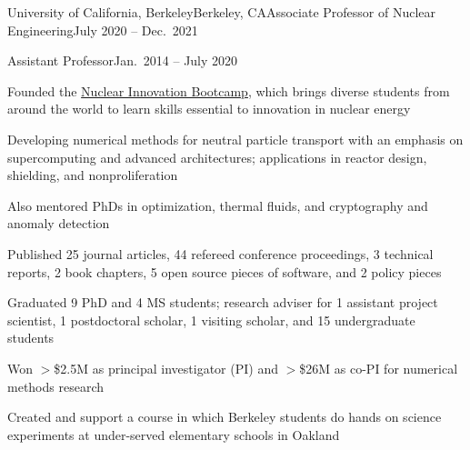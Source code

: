 \begin{rSubsection}{University of California, Berkeley}{Berkeley, CA}{Associate Professor of Nuclear Engineering}{July 2020 -- Dec.\ 2021}
\end{rSubsection}
\vspace*{-2 em}
\begin{rSubsection}{}{}{Assistant Professor}{Jan.\ 2014 -- July 2020}
\item Founded the \href{https://www.nuclearinnovationbootcamp.org/}{Nuclear Innovation Bootcamp}, which brings diverse students from around the world to learn skills essential to innovation in nuclear energy 
\item Developing numerical methods for neutral particle transport with an emphasis on supercomputing and advanced architectures; applications in reactor design, shielding, and nonproliferation
\item Also mentored PhDs in optimization, thermal fluids, and cryptography and anomaly detection 
\item Published 25 journal articles, 44 refereed conference proceedings, 3 technical reports, 2 book chapters, 5 open source pieces of software, and 2 policy pieces
\item Graduated 9 PhD and 4 MS students; research adviser for 1 assistant project scientist, 1 postdoctoral scholar, 1 visiting scholar, and 15 undergraduate students
\item Won $>$\$2.5M as principal investigator (PI) and $>$\$26M as co-PI for numerical methods research
\item Created and support a course in which Berkeley students do hands on science experiments at under-served elementary schools in Oakland
\end{rSubsection}


